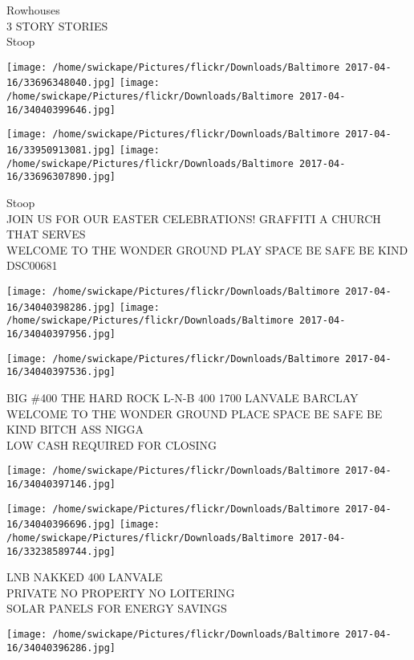 \documentclass[10pt,letterpaper]{article}
\begin{document}
Rowhouses\\
3 STORY STORIES\\
Stoop\\
\pagebreak

\texttt{[image: /home/swickape/Pictures/flickr/Downloads/Baltimore 2017-04-16/33696348040.jpg]}
\texttt{[image: /home/swickape/Pictures/flickr/Downloads/Baltimore 2017-04-16/34040399646.jpg]}

\texttt{[image: /home/swickape/Pictures/flickr/Downloads/Baltimore 2017-04-16/33950913081.jpg]}
\texttt{[image: /home/swickape/Pictures/flickr/Downloads/Baltimore 2017-04-16/33696307890.jpg]}

Stoop\\
JOIN US FOR OUR EASTER CELEBRATIONS!  GRAFFITI A CHURCH THAT SERVES\\
WELCOME TO THE WONDER GROUND PLAY SPACE BE SAFE BE KIND\\
DSC00681\\
\pagebreak

\texttt{[image: /home/swickape/Pictures/flickr/Downloads/Baltimore 2017-04-16/34040398286.jpg]}
\texttt{[image: /home/swickape/Pictures/flickr/Downloads/Baltimore 2017-04-16/34040397956.jpg]}

\texttt{[image: /home/swickape/Pictures/flickr/Downloads/Baltimore 2017-04-16/34040397536.jpg]}

BIG \#400 THE HARD ROCK L{-}N{-}B 400 1700 LANVALE BARCLAY\\
WELCOME TO THE WONDER GROUND PLACE SPACE BE SAFE BE KIND BITCH ASS NIGGA\\
LOW CASH REQUIRED FOR CLOSING\\
\pagebreak

\texttt{[image: /home/swickape/Pictures/flickr/Downloads/Baltimore 2017-04-16/34040397146.jpg]}

\vspace{0.25in}
\texttt{[image: /home/swickape/Pictures/flickr/Downloads/Baltimore 2017-04-16/34040396696.jpg]}
\texttt{[image: /home/swickape/Pictures/flickr/Downloads/Baltimore 2017-04-16/33238589744.jpg]}

LNB NAKKED 400 LANVALE\\
PRIVATE NO PROPERTY NO LOITERING\\
SOLAR PANELS FOR ENERGY SAVINGS\\
\pagebreak

\texttt{[image: /home/swickape/Pictures/flickr/Downloads/Baltimore 2017-04-16/34040396286.jpg]}
\end{document}
